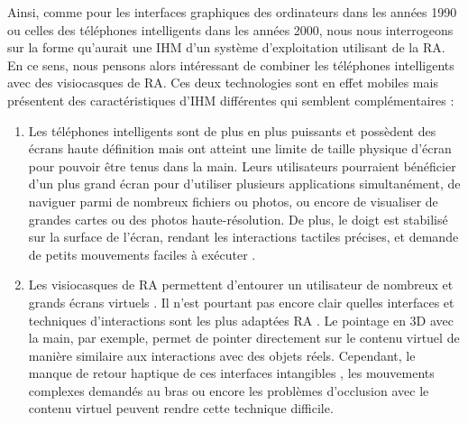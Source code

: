 Ainsi, comme pour les interfaces graphiques des ordinateurs dans les années 1990 ou celles des téléphones intelligents dans les années 2000, nous nous interrogeons sur la forme qu'aurait une IHM d'un système d'exploitation utilisant de la RA. En ce sens, nous pensons alors intéressant de combiner les téléphones intelligents avec des visiocasques de RA. Ces deux technologies sont en effet mobiles mais présentent des caractéristiques d'IHM différentes qui semblent complémentaires :
\begin{enumerate}
  \item Les téléphones intelligents sont de plus en plus puissants et possèdent des écrans haute définition mais ont atteint une limite de taille physique d'écran pour pouvoir être tenus dans la main. Leurs utilisateurs pourraient bénéficier d'un plus grand écran pour d'utiliser plusieurs applications simultanément, de naviguer parmi de nombreux fichiers ou photos, ou encore de visualiser de grandes cartes ou des photos haute-résolution. De plus, le doigt est stabilisé sur la surface de l'écran, rendant les interactions tactiles précises, et demande de petits mouvements faciles à exécuter \citep{Argelaguet2013}.
  \item Les visiocasques de RA permettent d'entourer un utilisateur de nombreux et grands écrans virtuels \citep{Ens2014}. Il n'est pourtant pas encore clair quelles interfaces et techniques d'interactions sont les plus adaptées RA \citep{Piumsomboon2013, Billinghurst2015}. Le pointage en 3D avec la main, par exemple, permet de pointer directement sur le contenu virtuel de manière similaire aux interactions avec des objets réels. Cependant, le manque de retour haptique de ces interfaces intangibles \citep{Chan2010}, les mouvements complexes demandés au bras \citep{Argelaguet2013} ou encore les problèmes d'occlusion avec le contenu virtuel \cite{Piumsomboon2014} peuvent rendre cette technique difficile.
\end{enumerate}
\medskip


